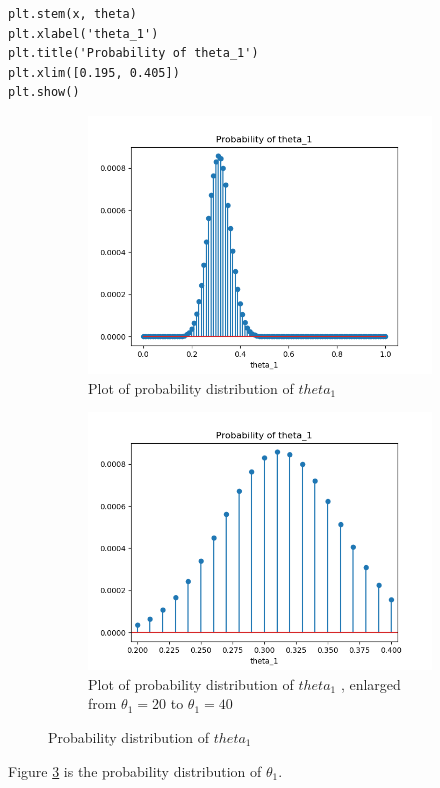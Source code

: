 \documentclass[preprint,12pt]{elsarticle}
\begin{document}
\begin{enumerate}
\begin{lstlisting}
plt.stem(x, theta)
plt.xlabel('theta_1')
plt.title('Probability of theta_1')
plt.xlim([0.195, 0.405])
plt.show()
    \end{lstlisting}
    \begin{figure}[htbp!]
        \center
        \begin{subfigure}{0.8\textwidth}
            \includegraphics[width = \textwidth]{3.png}
            \caption{Plot of probability distribution of $theta_1$}
            \label{fig:21}
        \end{subfigure}
        \begin{subfigure}{0.8\textwidth}
            \includegraphics[width = \textwidth]{4.png}
            \caption{Plot of probability distribution of $theta_1$
            , enlarged from $\theta_1=20$ to $\theta_1=40$}
            \label{fig:22}
        \end{subfigure}
        \caption{Probability distribution of $theta_1$}
        \label{fig:2}
    \end{figure}
    Figure \ref{fig:2} is the probability distribution of $\theta_1$.
 

\end{enumerate}
\end{document}
